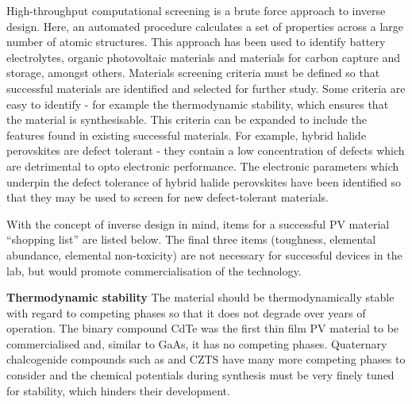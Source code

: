 High-throughput computational screening is a brute force approach to inverse design. Here, an automated procedure calculates a set of properties across a large number of atomic structures. This approach has been used to identify battery electrolytes,\autocite{Qu2015} organic photovoltaic materials\autocite{Hachmann2011} and materials for carbon capture and storage,\autocite{Dunstan2016} amongst others. 
Materials screening criteria must be defined so that successful materials are identified and selected for further study. Some criteria are easy to identify - for example the thermodynamic stability, which ensures that the material is synthesisable. This criteria can be expanded to include the features found in existing successful materials. For example, hybrid halide perovskites are defect tolerant - they contain a low concentration of defects which are detrimental to opto electronic performance. The electronic parameters which underpin the defect tolerance of hybrid halide perovskites have been identified so that they may be used to screen for new defect-tolerant materials.\autocite{Brandt2015} 

With the concept of inverse design in mind, items for a successful PV material ``shopping list'' are listed below. The final three items (toughness, elemental abundance, elemental non-toxicity) are not necessary for successful devices in the lab, but would promote commercialisation of the technology.

\newline
\textbf{Thermodynamic stability}\newline
The material should be thermodynamically stable with regard to competing phases so that it does not degrade over years of operation. The binary compound CdTe was the first thin film PV material to be commercialised and, similar to GaAs, it has no competing phases. Quaternary chalcogenide compounds such as  and CZTS have many more competing phases to consider and the chemical potentials during synthesis must be very finely tuned for stability, which hinders their development.

